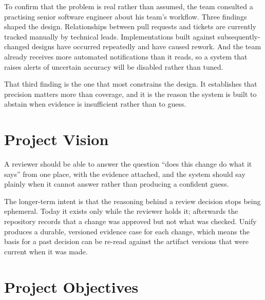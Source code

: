 To confirm that the problem is real rather than assumed, the team consulted a
practising senior software engineer about his team's workflow. Three findings
shaped the design. Relationships between pull requests and tickets are currently
tracked manually by technical leads. Implementations built against
subsequently-changed designs have occurred repeatedly and have caused
rework. And the team already receives more automated notifications than it
reads, so a system that raises alerts of uncertain accuracy will be disabled
rather than tuned.

That third finding is the one that most constrains the design. It establishes
that precision matters more than coverage, and it is the reason the system is
built to abstain when evidence is insufficient rather than to guess.

\section{Project Vision}

A reviewer should be able to answer the question ``does this change do what it
says'' from one place, with the evidence attached, and the system should say
plainly when it cannot answer rather than producing a confident guess.

The longer-term intent is that the reasoning behind a review decision stops
being ephemeral. Today it exists only while the reviewer holds it; afterwards
the repository records that a change was approved but not what was checked.
Unify produces a durable, versioned evidence case for each change, which means
the basis for a past decision can be re-read against the artifact versions that
were current when it was made.

\section{Project Objectives}

